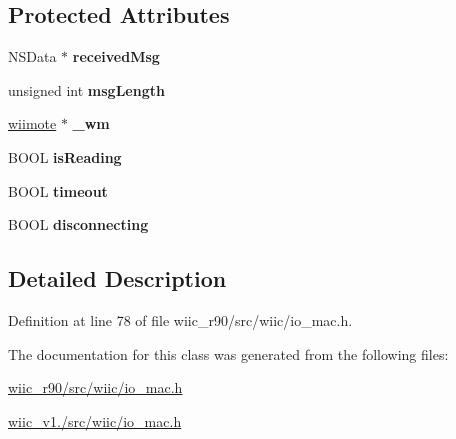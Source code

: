 \subsection*{Protected Attributes}
\begin{DoxyCompactItemize}
\item 
\hypertarget{interface_wii_connect_a8e57174e3a2aab3ba37e0cf26eebd37c}{N\-S\-Data $\ast$ {\bfseries received\-Msg}}\label{interface_wii_connect_a8e57174e3a2aab3ba37e0cf26eebd37c}

\item 
\hypertarget{interface_wii_connect_ac15cec89972ac285875a76e9f1576060}{unsigned int {\bfseries msg\-Length}}\label{interface_wii_connect_ac15cec89972ac285875a76e9f1576060}

\item 
\hypertarget{interface_wii_connect_aa378a6468d925fb412eb3cbd12f6b2b2}{\hyperlink{structwiimote__t}{wiimote} $\ast$ {\bfseries \-\_\-wm}}\label{interface_wii_connect_aa378a6468d925fb412eb3cbd12f6b2b2}

\item 
\hypertarget{interface_wii_connect_a578cdc47ce08accc0072b70dc99ac666}{B\-O\-O\-L {\bfseries is\-Reading}}\label{interface_wii_connect_a578cdc47ce08accc0072b70dc99ac666}

\item 
\hypertarget{interface_wii_connect_afcc5333eadf106d01476621373122418}{B\-O\-O\-L {\bfseries timeout}}\label{interface_wii_connect_afcc5333eadf106d01476621373122418}

\item 
\hypertarget{interface_wii_connect_aa6640f064f8d382d4612e200e14e06a8}{B\-O\-O\-L {\bfseries disconnecting}}\label{interface_wii_connect_aa6640f064f8d382d4612e200e14e06a8}

\end{DoxyCompactItemize}


\subsection{Detailed Description}


Definition at line 78 of file wiic\-\_\-r90/src/wiic/io\-\_\-mac.\-h.



The documentation for this class was generated from the following files\-:\begin{DoxyCompactItemize}
\item 
\hyperlink{wiic__r90_2src_2wiic_2io__mac_8h}{wiic\-\_\-r90/src/wiic/io\-\_\-mac.\-h}\item 
\hyperlink{wiic__v1_81_2src_2wiic_2io__mac_8h}{wiic\-\_\-v1./src/wiic/io\-\_\-mac.\-h}\end{DoxyCompactItemize}
